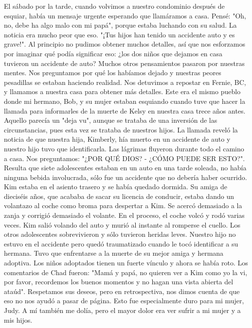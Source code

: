 \documentclass[twoside, 12pt]{book}
\begin{document}
El sábado por la tarde, cuando volvimos a nuestro condominio después de esquiar, había un mensaje urgente esperando que llamáramos a casa. Pensé: "Oh, no, debe ha algo malo con mi papá", porque estaba luchando con su salud. La noticia era mucho peor que eso. "¡Tus hijos han tenido un accidente auto y es grave!". Al principio no pudimos obtener muchos detalles, así que nos esforzamos por imaginar qué podía significar eso: ¿los dos niños que dejamos en casa tuvieron un accidente de auto? Muchos otros pensamientos pasaron por nuestras mentes. Nos preguntamos por qué los habíamos dejado y nuestras peores pesadillas se estaban haciendo realidad. Nos detuvimos a repostar en Fernie, BC, y llamamos a nuestra casa para obtener más detalles. Este era el mismo pueblo donde mi hermano, Bob, y su mujer estaban esquiando cuando tuve que hacer la llamada para informarles de la muerte de Kelsy en nuestra casa trece años antes. Aquello parecía un "deja vu", aunque se trataba de una inversión de las circunstancias, pues esta vez se trataba de nuestros hijos. La llamada reveló la noticia de que nuestra hija, Kimberly, hía muerto en un accidente de auto y nuestro hijo tuvo que identificarla. Las lágrimas fluyeron durante todo el camino a casa. Nos preguntamos: "¿POR QUÉ DIOS? - ¿CÓMO PUEDE SER ESTO?". Resulta que siete adolescentes estaban en un auto en una tarde soleada, no había ninguna bebida involucrada, sólo fue un accidente que no debería haber ocurrido. Kim estaba en el asiento trasero y se había quedado dormida. Su amiga de dieciséis años, que acababa de sacar su licencia de conducir, estaba dando un volantazo al coche como broma para despertar a Kim. Se acercó demasiado a la zanja y corrigió demasiado el volante. En el proceso, el coche volcó y rodó varias veces. Kim salió volando del auto y murió al instante al romperse el cuello. Los otros adolescentes sobrevivieron y sólo tuvieron heridas leves. Nuestro hijo no estuvo en el accidente pero quedó traumatizado cuando le tocó identificar a su hermana. Tuvo que enfrentarse a la muerte de su mejor amiga y hermana adoptiva. Los niños adoptados tienen un fuerte vínculo y ahora se había roto. Los comentarios de Chad fueron: "Mamá y papá, no quieren ver a Kim como yo la vi, por favor, recordemos los buenos momentos y no hagan una vista abierta del ataúd". Respetamos sus deseos, pero en retrospectiva, nos dimos cuenta de que eso no nos ayudó a pasar de página. Esto fue especialmente duro para mi mujer, Judy. A mí también me dolía, pero el mayor dolor era ver sufrir a mi mujer y a mis hijos.\\
\end{document}
